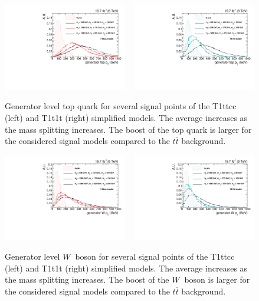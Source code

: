 \begin{figure}[htpb]
\centering
\includegraphics[width=0.48\textwidth]{figures/razor_strategy/T1ttcc_gentoppt}
~
\includegraphics[width=0.48\textwidth]{figures/razor_strategy/T1t1t_gentoppt}
\caption{Generator level top quark \pt for several signal points of the T1ttcc (left) and T1t1t
(right) simplified models. The average \pt increases as the mass splitting increases. The boost of
the top quark is larger for the considered signal models compared to the $t\bar{t}$ background. 
\label{fig:boost_gen_toppt}}
\end{figure}
\begin{figure}[htpb]
\centering
\includegraphics[width=0.48\textwidth]{figures/razor_strategy/T1ttcc_genWpt}
~
\includegraphics[width=0.48\textwidth]{figures/razor_strategy/T1t1t_genWpt}
\caption{Generator level $W$ boson \pt for several signal points of the T1ttcc (left) and T1t1t
(right)
simplified models. The average \pt increases as the mass splitting increases. The boost of the $W$
boson is larger for the considered signal models compared to the $t\bar{t}$ background. 
\label{fig:boost_gen_Wpt}}
\end{figure}

